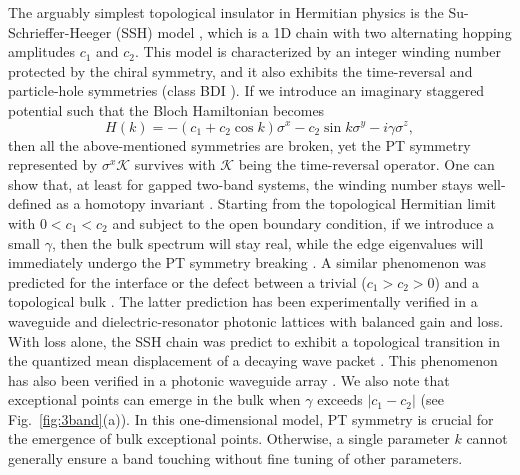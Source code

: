 \documentclass{tADP2e}
\theoremstyle{plain}
\theoremstyle{plain}
\theoremstyle{definition}
\begin{document}
The arguably simplest topological insulator in Hermitian physics is the Su-Schrieffer-Heeger (SSH) model \cite{SWP79}, which is a 1D chain with two alternating hopping amplitudes $c_1$ and $c_2$. This model is characterized by an integer winding number protected by the chiral symmetry, and it also exhibits the time-reversal and particle-hole symmetries (class BDI \cite{SAP08}). If we introduce an imaginary staggered potential such that the Bloch Hamiltonian becomes
\begin{equation}
H(k)=-(c_1+c_2\cos k)\sigma^x-c_2\sin k \sigma^y-i\gamma \sigma^z,
\label{PTSSH}
\end{equation} 
then all the above-mentioned symmetries are broken, yet the PT symmetry represented by $\sigma^x\mathcal{K}$ survives with $\mathcal{K}$ being the time-reversal operator. One can show that, at least for gapped two-band systems, the winding number stays well-defined as a homotopy invariant \cite{ZG18}. Starting from the topological Hermitian limit with $0<c_1<c_2$ and subject to the open boundary condition, if we introduce a small $\gamma$, then the bulk spectrum will stay real, while the edge eigenvalues will immediately undergo the PT symmetry breaking \cite{HYC11}. A similar phenomenon was predicted for the interface or the defect between a trivial ($c_1>c_2>0$) and a topological bulk \cite{HS13}. The latter prediction has been experimentally verified in a waveguide \cite{WS17} and dielectric-resonator \cite{CP15} photonic lattices with balanced gain and loss. 
With loss alone, the SSH chain was predict to exhibit a topological transition in the quantized mean displacement of a decaying wave packet \cite{RMS09}. This phenomenon has also been verified in a photonic waveguide array \cite{ZJM15}. We also note that exceptional points can emerge in the bulk when $\gamma$ exceeds $|c_1-c_2|$ (see Fig.~\ref{fig:3band}(a)). In this one-dimensional model, PT symmetry is crucial for the emergence of bulk exceptional points. Otherwise, a single parameter $k$ cannot generally ensure a band touching without fine tuning of other parameters.
\end{document}

